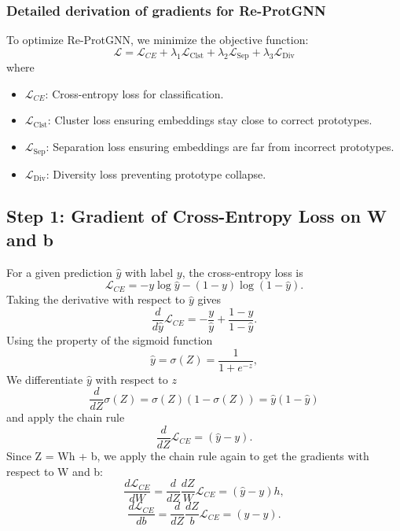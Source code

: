 \documentclass[12pt]{article}
\begin{document}
\subsubsection*{Detailed derivation of gradients for Re-ProtGNN}

To optimize Re-ProtGNN, we minimize the objective function:
\begin{equation*}
    \mathcal{L} = \mathcal{L}_{CE} + \lambda_1 \mathcal{L}_{\text{Clst}} + \lambda_2 \mathcal{L}_{\text{Sep}} + \lambda_3 \mathcal{L}_{\text{Div}}
\end{equation*}
where
\begin{itemize}
    \item $\mathcal{L}_{CE}$: Cross-entropy loss for classification.
    \item $\mathcal{L}_{\text{Clst}}$: Cluster loss ensuring embeddings stay close to correct prototypes.
    \item $\mathcal{L}_{\text{Sep}}$: Separation loss ensuring embeddings are far from incorrect prototypes.
    \item $\mathcal{L}_{\text{Div}}$: Diversity loss preventing prototype collapse.
\end{itemize}

\subsection*{Step 1: Gradient of Cross-Entropy Loss on W and b}
For a given prediction $\hat{y}$ with label $y$, the cross-entropy loss is
\begin{equation*}
    \mathcal{L}_{CE} = - y \log \hat{y} - (1 - y) \log (1 - \hat{y}).
\end{equation*}
Taking the derivative with respect to $\hat{y}$ gives
\begin{equation*}
    \frac{d}{d\hat{y}} \mathcal{L}_{CE} = -\frac{y}{\hat{y}} + \frac{1 - y}{1 - \hat{y}}.
\end{equation*}
Using the property of the sigmoid function
\begin{equation*}
    \hat{y} = \sigma(Z) = \frac{1}{1 + e^{-z}},
\end{equation*}
We differentiate $\hat{y}$ with respect to $z$
\begin{equation*}
    \frac{d}{dZ} \sigma(Z) = \sigma(Z)(1 - \sigma(Z)) = \hat{y} (1 - \hat{y})
\end{equation*}
and apply the chain rule
\begin{equation*}
    \frac{d}{dZ} \mathcal{L}_{CE} = (\hat{y} - y).
\end{equation*}
Since Z = Wh + b, we apply the chain rule again to get the gradients with respect to W and b:
\begin{equation*}
    \frac{d\mathcal{L}_{CE}}{dW} = \frac{d}{dZ} \frac{dZ}{W}\mathcal{L}_{CE} = (\hat{y} - y)h,
\end{equation*}
\begin{equation*}
     \frac{d\mathcal{L}_{CE}}{db} = \frac{d}{dZ} \frac{dZ}{b}\mathcal{L}_{CE} = (\hat{y} - y).
\end{equation*}
\end{document}
